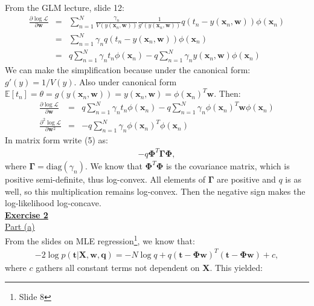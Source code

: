 \documentclass[a4paper, 11pt]{article}
\begin{document}
From the GLM lecture, slide 12:
\begin{eqnarray}
\frac{\partial \log \mathcal{L}}{\partial \mathbf{w}} &=& \sum_{n=1}^{N} \frac{\gamma_n}{V(y(\mathbf{x}_n, \mathbf{w}))} \frac{1}{g'(y(\mathbf{x}_n, \mathbf{w}))} q(t_n - y(\mathbf{x}_n, \mathbf{w})) \phi(\mathbf{x}_n)  \nonumber \\
&=& \sum_{n=1}^{N} \gamma_n q(t_n - y(\mathbf{x}_n, \mathbf{w})) \phi(\mathbf{x}_n) \nonumber \\
&=& q \sum_{n=1}^{N} \gamma_n t_n \phi(\mathbf{x}_n) - q \sum_{n=1}^{N} \gamma_n y(\mathbf{x}_n, \mathbf{w}) \phi(\mathbf{x}_n)   \nonumber
\end{eqnarray}
We can make the simplification because under the canonical form: $g'(y) = 1/V(y)$. Also under canonical form $\mathbb{E}[t_n] = \theta = g(y(\mathbf{x}_n, \mathbf{w})) = y(\mathbf{x}_n, \mathbf{w}) = \phi(\mathbf{x}_n)^T \mathbf{w}$. Then:
\begin{eqnarray}
\frac{\partial \log \mathcal{L}}{\partial \mathbf{w}} &=& q \sum_{n=1}^{N} \gamma_n t_n \phi(\mathbf{x}_n) - q \sum_{n=1}^{N} \gamma_n \phi(\mathbf{x}_n)^T \mathbf{w} \phi(\mathbf{x}_n)  \nonumber \\
\frac{\partial^2 \log \mathcal{L}}{\partial \mathbf{w}^2} &=& -q \sum_{n=1}^{N} \gamma_n \phi(\mathbf{x}_n)^T \phi(\mathbf{x}_n)
\end{eqnarray}
In matrix form write (5) as:
\begin{eqnarray}
-q \mathbf{\Phi}^T \mathbf{\Gamma} \mathbf{\Phi}, \nonumber
\end{eqnarray}
where $\mathbf{\Gamma} = \text{diag}(\gamma_n)$. We know that $\mathbf{\Phi}^T \mathbf{\Phi}$ is the covariance matrix, which is positive semi-definite, thus log-convex. All elements of $\mathbf{\Gamma}$ are positive and $q$ is as well, so this multiplication remains log-convex. Then the negative sign makes the log-likelihood  log-concave.\\
\newpage
\textbf{\underline{Exercise 2}}\\
\newline \underline{Part (a)}\\
\newline From the slides on MLE regression\footnote{Slide 8}, we know that:
\begin{eqnarray}
-2 \log p(\mathbf{t} | \mathbf{X}, \mathbf{w}, \mathbf{q}) = -N \log q + q (\mathbf{t} - \mathbf{\Phi w})^T (\mathbf{t} - \mathbf{\Phi w}) + c, \nonumber
\end{eqnarray}
where $c$ gathers all constant terms not dependent on $\mathbf{X}$. This yielded:
\end{document}
